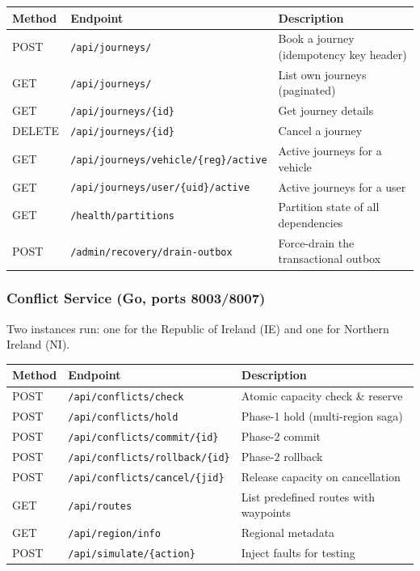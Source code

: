 \documentclass[12pt,a4paper]{article}
\begin{document}
\begin{table}[H]
\centering\small
\begin{tabularx}{\textwidth}{l l X}
  \toprule
  \textbf{Method} & \textbf{Endpoint} & \textbf{Description} \\
  \midrule
  POST   & \texttt{/api/journeys/}                     & Book a journey (idempotency key header) \\
  GET    & \texttt{/api/journeys/}                      & List own journeys (paginated) \\
  GET    & \texttt{/api/journeys/\{id\}}                & Get journey details \\
  DELETE & \texttt{/api/journeys/\{id\}}                & Cancel a journey \\
  GET    & \texttt{/api/journeys/vehicle/\{reg\}/active} & Active journeys for a vehicle \\
  GET    & \texttt{/api/journeys/user/\{uid\}/active}   & Active journeys for a user \\
  GET    & \texttt{/health/partitions}                  & Partition state of all dependencies \\
  POST   & \texttt{/admin/recovery/drain-outbox}        & Force-drain the transactional outbox \\
  \bottomrule
\end{tabularx}
\end{table}

\subsubsection{Conflict Service (Go, ports 8003/8007)}

Two instances run: one for the Republic of Ireland (IE) and one for Northern Ireland (NI).

\begin{table}[H]
\centering\small
\begin{tabularx}{\textwidth}{l l X}
  \toprule
  \textbf{Method} & \textbf{Endpoint} & \textbf{Description} \\
  \midrule
  POST & \texttt{/api/conflicts/check}              & Atomic capacity check \& reserve \\
  POST & \texttt{/api/conflicts/hold}               & Phase-1 hold (multi-region saga) \\
  POST & \texttt{/api/conflicts/commit/\{id\}}      & Phase-2 commit \\
  POST & \texttt{/api/conflicts/rollback/\{id\}}    & Phase-2 rollback \\
  POST & \texttt{/api/conflicts/cancel/\{jid\}}     & Release capacity on cancellation \\
  GET  & \texttt{/api/routes}                       & List predefined routes with waypoints \\
  GET  & \texttt{/api/region/info}                  & Regional metadata \\
  POST & \texttt{/api/simulate/\{action\}}          & Inject faults for testing \\
  \bottomrule
\end{tabularx}
\end{table}
\end{document}
